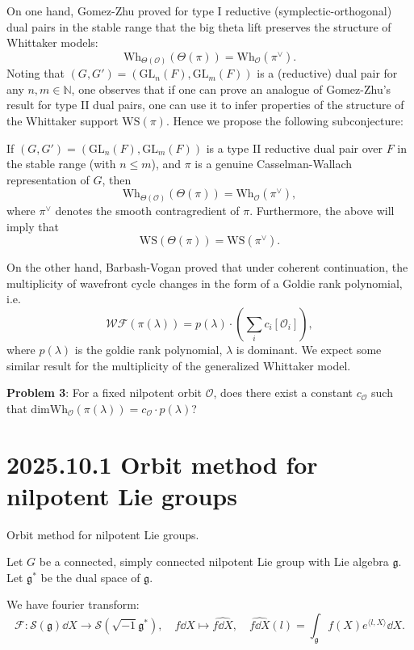 \documentclass[12pt]{amsart}
\numberwithin{equation}{section}
\newcommand{\fg}{\mathfrak{g}} \newcommand{\fh}{\mathfrak{h}} \newcommand{\fk}{\mathfrak{k}}
\newcommand{\GL}{{\mathrm{GL}}} \newcommand{\SL}{{\mathrm{SL}}} \newcommand{\SU}{{\mathrm{SU}}}
\renewcommand{\hat}{\widehat}
\begin{document}
On one hand, Gomez-Zhu \cite{GZ14} proved for type I reductive (symplectic-orthogonal) dual pairs in the stable range that the big theta lift preserves the structure of Whittaker models:
\[\mathrm{Wh}_{\Theta(\mathcal{O})}\left(\Theta(\pi)\right)=\mathrm{Wh}_\mathcal{O}(\pi^\vee).\]
Noting that $(G,G')=(\GL_n(F),\GL_m(F))$ is a (reductive) dual pair for any $n,m\in\mathbb{N}$, one observes that if one can prove an analogue of Gomez-Zhu's result for type II dual pairs, one can use it to infer properties of the structure of the Whittaker support $\mathrm{WS}(\pi)$. Hence we propose the following subconjecture:
\begin{conj}
    If $(G,G')=(\GL_n(F),\GL_m(F))$ is a type II reductive dual pair over $F$ in the stable range (with $n\leq m$), and $\pi$ is a genuine Casselman-Wallach representation of $G$, then
    \[\mathrm{Wh}_{\Theta(\mathcal{O})}\left(\Theta(\pi)\right)=\mathrm{Wh}_\mathcal{O}(\pi^\vee),\]
    where $\pi^\vee$ denotes the smooth contragredient of $\pi$. Furthermore, the above will imply that
    \[\mathrm{WS}\left(\Theta(\pi)\right)=\mathrm{WS}(\pi^\vee).\]
\end{conj}

On the other hand, Barbash-Vogan \cite{BV80} proved that under coherent continuation, the multiplicity of wavefront cycle changes in the form of a Goldie rank polynomial, i.e. 
\[
    \mathcal{WF}(\pi(\lambda)) = p(\lambda) \cdot (\sum\limits_{i} c_i [\mathcal{O}_i]),
\]
where $p(\lambda)$ is the goldie rank polynomial, $\lambda$ is dominant. We expect some similar result for the multiplicity of the generalized Whittaker model.

\textbf{Problem 3}: For a fixed nilpotent orbit $\mathcal{O}$, does there exist a constant $c_{\mathcal{O}}$ such that $\mathrm{dim} \mathrm{Wh}_{\mathcal{O}}(\pi(\lambda)) = c_{\mathcal{O}} \cdot p(\lambda)$?





\section{2025.10.1 Orbit method for nilpotent Lie groups}

Orbit method for nilpotent Lie groups.

Let $G$ be a connected, simply connected nilpotent Lie group with Lie algebra $\fg$. Let $\fg^*$ be the dual space of $\fg$.

We have fourier transform:
\[
    \mathcal{F} : \mathcal{S}(\fg)\dd X \to \mathcal{S}(\sqrt{-1}\fg^*), \quad f\dd X \mapsto \hat{f\dd X}, \quad \hat{f\dd X}(l) = \int_{\fg} f(X) e^{\langle l,X\rangle} \dd X. 
\]
\end{document}
